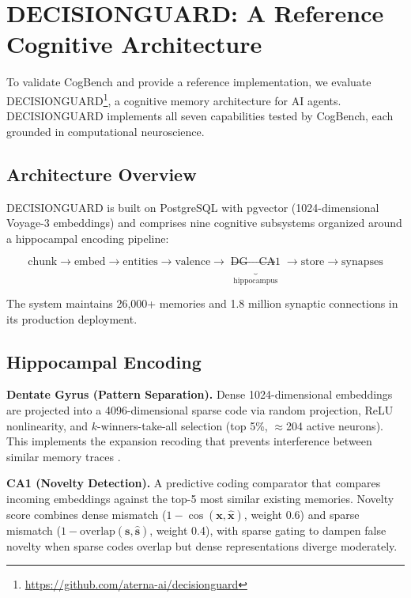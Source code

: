 \documentclass{article}
\begin{document}
\section{DECISIONGUARD: A Reference Cognitive Architecture}
\label{sec:decisionguard}

To validate CogBench and provide a reference implementation, we evaluate DECISIONGUARD\footnote{\url{https://github.com/aterna-ai/decisionguard}}, a cognitive memory architecture for AI agents. DECISIONGUARD implements all seven capabilities tested by CogBench, each grounded in computational neuroscience.

\subsection{Architecture Overview}

DECISIONGUARD is built on PostgreSQL with pgvector (1024-dimensional Voyage-3 embeddings) and comprises nine cognitive subsystems organized around a hippocampal encoding pipeline:

\begin{equation}
\text{chunk} \rightarrow \text{embed} \rightarrow \text{entities} \rightarrow \text{valence} \rightarrow \underbrace{\text{DG} \rightarrow \text{CA1}}_{\text{hippocampus}} \rightarrow \text{store} \rightarrow \text{synapses}
\end{equation}

The system maintains 26,000+ memories and 1.8 million synaptic connections in its production deployment.

\subsection{Hippocampal Encoding}

\textbf{Dentate Gyrus (Pattern Separation).} Dense 1024-dimensional embeddings are projected into a 4096-dimensional sparse code via random projection, ReLU nonlinearity, and $k$-winners-take-all selection (top 5\%, $\approx$204 active neurons). This implements the expansion recoding that prevents interference between similar memory traces \citep{rolls2013mechanisms}.

\textbf{CA1 (Novelty Detection).} A predictive coding comparator that compares incoming embeddings against the top-5 most similar existing memories. Novelty score combines dense mismatch ($1 - \cos(\mathbf{x}, \hat{\mathbf{x}})$, weight 0.6) and sparse mismatch ($1 - \text{overlap}(\mathbf{s}, \hat{\mathbf{s}})$, weight 0.4), with sparse gating to dampen false novelty when sparse codes overlap but dense representations diverge moderately.
\end{document}
